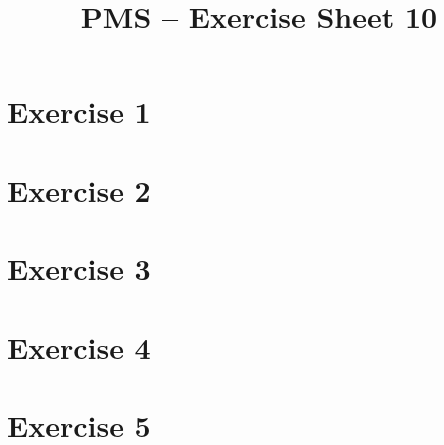 \documentclass[10pt,DIV10,a4paper]{scrartcl}
\title{PMS -- Exercise Sheet 10}
\date{}
\begin{document}
\maketitle

\section*{Exercise 1}

\section*{Exercise 2}

\section*{Exercise 3}

\section*{Exercise 4}

\section*{Exercise 5}
\end{document}

